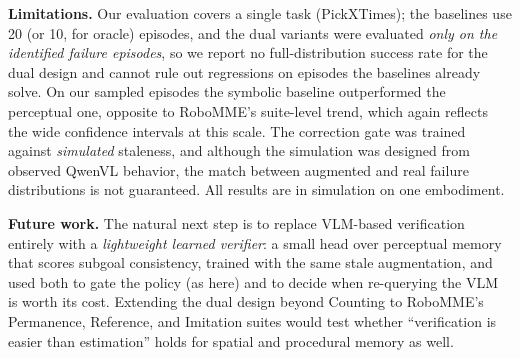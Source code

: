 \documentclass{article}
\begin{document}
\textbf{Limitations.} Our evaluation covers a single task (PickXTimes); the baselines use 20 (or 10, for oracle) episodes, and the dual variants were evaluated \emph{only on the identified failure episodes}, so we report no full-distribution success rate for the dual design and cannot rule out regressions on episodes the baselines already solve. On our sampled episodes the symbolic baseline outperformed the perceptual one, opposite to RoboMME's suite-level trend, which again reflects the wide confidence intervals at this scale. The correction gate was trained against \emph{simulated} staleness, and although the simulation was designed from observed QwenVL behavior, the match between augmented and real failure distributions is not guaranteed. All results are in simulation on one embodiment.

\textbf{Future work.} The natural next step is to replace VLM-based verification entirely with a \emph{lightweight learned verifier}: a small head over perceptual memory that scores subgoal consistency, trained with the same stale augmentation, and used both to gate the policy (as here) and to decide when re-querying the VLM is worth its cost. Extending the dual design beyond Counting to RoboMME's Permanence, Reference, and Imitation suites would test whether ``verification is easier than estimation'' holds for spatial and procedural memory as well.



\end{document}
